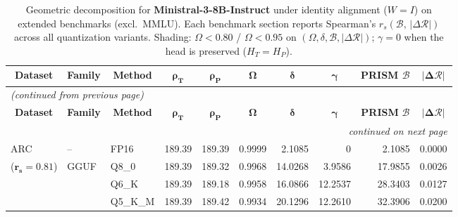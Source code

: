 \begingroup
\small
\setlength{\tabcolsep}{4pt}
\renewcommand{\arraystretch}{1.05}
\setlength{\LTcapwidth}{\textwidth}
\begin{longtable}{ll l rrrrrrr}
\caption{Geometric decomposition for \textbf{Ministral-3-8B-Instruct} under identity alignment ($W{=}I$) on extended benchmarks (excl.\ MMLU). Each benchmark section reports Spearman's $r_s(\mathcal{B},\,|\Delta\mathcal{R}|)$ across all quantization variants. Shading: \colorbox{red!35}{$\Omega{<}0.80$} / \colorbox{red!18}{$\Omega{<}0.95$} on $(\Omega,\delta,\mathcal{B},|\Delta\mathcal{R}|)$; \colorbox{cyan!12}{$\gamma{=}0$} when the head is preserved ($H_T{=}H_P$).}\label{tab:mistral_instruct_decomposition_ext_bound}\\
\toprule
\multicolumn{1}{c}{\textbf{Dataset}} & \multicolumn{1}{c}{\textbf{Family}} & \multicolumn{1}{c}{\textbf{Method}} & \multicolumn{1}{c}{$\boldsymbol{\rho_T}$} & \multicolumn{1}{c}{$\boldsymbol{\rho_P}$} & \multicolumn{1}{c}{$\boldsymbol{\Omega}$} & \multicolumn{1}{c}{$\boldsymbol{\delta}$} & \multicolumn{1}{c}{$\boldsymbol{\gamma}$} & \multicolumn{1}{c}{\textbf{PRISM} $\boldsymbol{\mathcal{B}}$} & \multicolumn{1}{c}{$\boldsymbol{|\Delta\mathcal{R}|}$} \\
\midrule
\endfirsthead
\multicolumn{10}{l}{\small\itshape (continued from previous page)}\\
\toprule
\multicolumn{1}{c}{\textbf{Dataset}} & \multicolumn{1}{c}{\textbf{Family}} & \multicolumn{1}{c}{\textbf{Method}} & \multicolumn{1}{c}{$\boldsymbol{\rho_T}$} & \multicolumn{1}{c}{$\boldsymbol{\rho_P}$} & \multicolumn{1}{c}{$\boldsymbol{\Omega}$} & \multicolumn{1}{c}{$\boldsymbol{\delta}$} & \multicolumn{1}{c}{$\boldsymbol{\gamma}$} & \multicolumn{1}{c}{\textbf{PRISM} $\boldsymbol{\mathcal{B}}$} & \multicolumn{1}{c}{$\boldsymbol{|\Delta\mathcal{R}|}$} \\
\midrule
\endhead
\midrule
\multicolumn{10}{r}{\small\itshape continued on next page}\\
\endfoot
\bottomrule
\endlastfoot
ARC & -- & FP16 & 189.39 & 189.39 & 0.9999 & 2.1085 & \cellcolor{cyan!12} $0$ & 2.1085 & 0.0000 \\
{\small ($\mathbf{r_s{=}0.81}$)} & GGUF & Q8\_0 & 189.39 & 189.32 & 0.9968 & 14.0268 & 3.9586 & 17.9855 & 0.0026 \\
 &  & Q6\_K & 189.39 & 189.18 & 0.9958 & 16.0866 & 12.2537 & 28.3403 & 0.0127 \\
 &  & Q5\_K\_M & 189.39 & 189.42 & 0.9934 & 20.1296 & 12.2610 & 32.3906 & 0.0200 \\

\end{longtable}
